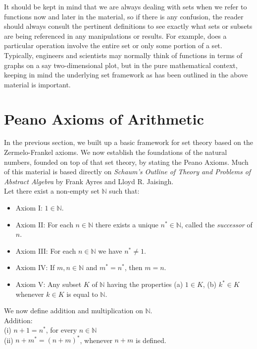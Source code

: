 It should be kept in mind that we are always dealing with sets when we refer to functions now and later in the material, so if there is any confusion, the reader should always consult the pertinent definitions to see exactly what sets or subsets are being referenced in any manipulations or results.  For example, does a particular operation involve the entire set or only some portion of a set.  Typically, engineers and scientists may normally think of functions in terms of graphs on a say two-dimensional plot, but in the pure mathematical context, keeping in mind the underlying set framework as has been outlined in the above material is important.

\section{Peano Axioms of Arithmetic}

In the previous section, we built up a basic framework for set theory based on the Zermelo-Frankel axioms.  We now establish the foundations of the natural numbers, founded on top of that set theory, by stating the Peano Axioms.  Much of this material is based directly on \textit{Schaum's Outline of Theory and Problems of Abstract Algebra} by Frank Ayres and Lloyd R. Jaisingh.\\

Let there exist a non-empty set $\mathbb{N}$ such that:

\begin{itemize}
\item Axiom I:  $1 \in \mathbb{N}$.
\item Axiom II:  For each $n \in \mathbb{N}$ there exists a unique $n^{*} \in \mathbb{N}$, called the \textit{successor} of $n$.
\item Axiom III:  For each $n \in \mathbb{N}$ we have $n^{*} \ne 1$.
\item Axiom IV:  If $m,n \in \mathbb{N}$ and $m^{*}=n^{*}$, then $m=n$.
\item Axiom V:  Any subset $K$ of $\mathbb{N}$ having the properties (a) $1 \in K$, (b) $k^{*} \in K$ whenever $k \in K$ is equal to $\mathbb{N}$. 
\end{itemize}

We now define addition and multiplication on $\mathbb{N}$.\\

Addition:\\
(i) $n+1=n^{*}$, for every $n \in \mathbb{N}$\\
(ii) $n+m^{*}=(n+m)^{*}$, whenever $n+m$ is defined.\\

